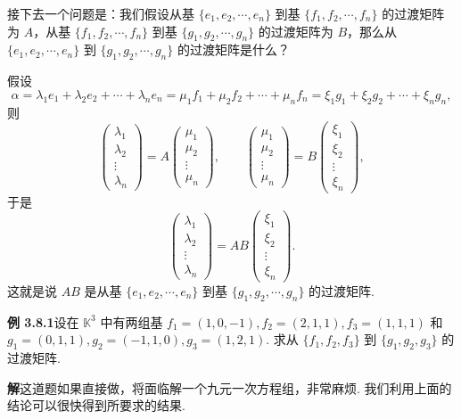 \documentclass[UTF8,12pt,a4paper,fontset=fandol]{ctexart}
\begin{document}
接下去一个问题是：我们假设从基 $\{e_1,e_2,\cdots,e_n\}$ 到基 $\{f_1,f_2,\cdots,f_n\}$ 的过渡矩阵为 $A$，从基 $\{f_1,f_2,\cdots,f_n\}$ 到基 $\{g_1,g_2,\cdots,g_n\}$ 的过渡矩阵为 $B$，那么从 $\{e_1,e_2,\cdots,e_n\}$ 到 $\{g_1,g_2,\cdots,g_n\}$ 的过渡矩阵是什么？

假设
\[
\alpha=\lambda_1e_1+\lambda_2e_2+\cdots+\lambda_ne_n
=\mu_1f_1+\mu_2f_2+\cdots+\mu_nf_n
=\xi_1g_1+\xi_2g_2+\cdots+\xi_ng_n,
\]
则
\[
\left(\begin{array}{c}
\lambda_1\\
\lambda_2\\
\vdots\\
\lambda_n
\end{array}\right)
=A
\left(\begin{array}{c}
\mu_1\\
\mu_2\\
\vdots\\
\mu_n
\end{array}\right),\qquad
\left(\begin{array}{c}
\mu_1\\
\mu_2\\
\vdots\\
\mu_n
\end{array}\right)
=B
\left(\begin{array}{c}
\xi_1\\
\xi_2\\
\vdots\\
\xi_n
\end{array}\right),
\]
于是
\[
\left(\begin{array}{c}
\lambda_1\\
\lambda_2\\
\vdots\\
\lambda_n
\end{array}\right)
=AB
\left(\begin{array}{c}
\xi_1\\
\xi_2\\
\vdots\\
\xi_n
\end{array}\right).
\]
这就是说 $AB$ 是从基 $\{e_1,e_2,\cdots,e_n\}$ 到基 $\{g_1,g_2,\cdots,g_n\}$ 的过渡矩阵.

\noindent\textbf{例 3.8.1}\quad 设在 $\mathbb{K}^3$ 中有两组基 $f_1=(1,0,-1),f_2=(2,1,1),f_3=(1,1,1)$ 和 $g_1=(0,1,1),g_2=(-1,1,0),g_3=(1,2,1)$. 求从 $\{f_1,f_2,f_3\}$ 到 $\{g_1,g_2,g_3\}$ 的过渡矩阵.

\noindent\textbf{解}\quad 这道题如果直接做，将面临解一个九元一次方程组，非常麻烦. 我们利用上面的结论可以很快得到所要求的结果.
\end{document}
